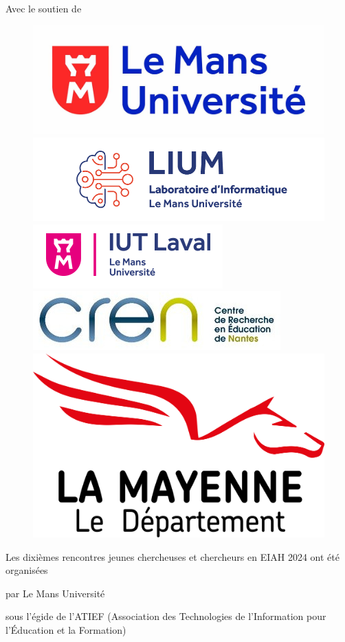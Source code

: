 \noindent Avec le soutien de

\begin{figure}[!ht]
	\centering
	\includegraphics[width=.15\textwidth,valign=m]{Content/figures/lemans_logo.jpg}\hfill
	\includegraphics[width=.3\textwidth,valign=m]{Content/figures/lium_logo.png}\hfill
	\includegraphics[width=.15\textwidth,valign=m]{Content/figures/logo_iut.png}\hfill
	\includegraphics[width=.22\textwidth,valign=m]{Content/figures/cren_logo.jpg}\hfill
	\includegraphics[width=.15\textwidth,valign=m]{Content/figures/mayenne_logo.png}\hfill
\end{figure}

\begin{center}
	\small{Les dixièmes rencontres jeunes chercheuses et chercheurs en EIAH 2024 ont été organisées}
 
    \small{par Le Mans Université}
    
    \small{sous l’égide de l’ATIEF (Association des Technologies de l’Information pour l’Éducation et la Formation)}
\end{center}

\restoregeometry
\newpage
